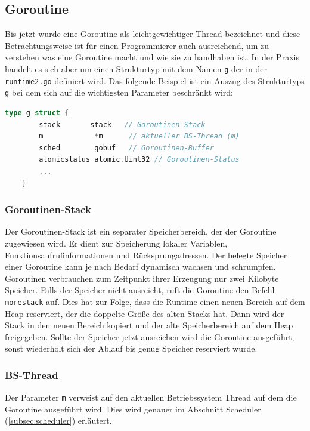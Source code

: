 \documentclass[fontsize=12pt,paper=a4,twoside=semi,parskip=half-,headsepline,headinclude]{scrreprt}
\begin{document}
\subsection{Goroutine}

Bis jetzt wurde eine Goroutine als leichtgewichtiger Thread bezeichnet und diese Betrachtungsweise ist für einen Programmierer auch ausreichend, um zu verstehen was eine Goroutine macht und wie sie zu handhaben ist. In der Praxis handelt es sich aber um einen Strukturtyp mit dem Namen \texttt{g} der in der \texttt{runtime2.go} \cite{goruntime2024} definiert wird. Das folgende Beispiel ist ein Auszug des Strukturtyps \texttt{g} bei dem sich auf die wichtigsten Parameter beschränkt wird:

\begin{lstlisting}[language=Go,extendedchars=true]
	type g struct {
		stack	    stack   // Goroutinen-Stack
		m       	 *m      // aktueller BS-Thread (m)
		sched   	 gobuf   // Goroutinen-Buffer
		atomicstatus atomic.Uint32 // Goroutinen-Status
		...
	}
\end{lstlisting}

\subsubsection{Goroutinen-Stack}

 Der Goroutinen-Stack ist ein separater Speicherbereich, der der Goroutine zugewiesen wird. Er dient zur Speicherung lokaler Variablen, Funktionsaufrufinformationen und Rücksprungadressen. Der belegte Speicher einer Goroutine kann je nach Bedarf dynamisch wachsen und schrumpfen. Goroutinen verbrauchen zum Zeitpunkt ihrer Erzeugung nur zwei Kilobyte Speicher. Falls der Speicher nicht ausreicht, ruft die Goroutine den Befehl \texttt{morestack} auf. Dies hat zur Folge, dass die Runtime einen neuen Bereich auf dem Heap reserviert, der die doppelte Größe des alten Stacks hat. Dann wird der Stack in den neuen Bereich kopiert und der  alte Speicherbereich auf dem Heap freigegeben. Sollte der Speicher jetzt ausreichen wird die Goroutine ausgeführt, sonst wiederholt sich der Ablauf bis genug Speicher reserviert wurde.
 
\subsubsection{BS-Thread}
 Der Parameter \texttt{m} verweist auf den aktuellen Betriebssystem Thread auf dem die Goroutine ausgeführt wird. Dies wird genauer im Abschnitt Scheduler (\ref{subsec:scheduler}) erläutert.
\end{document}

